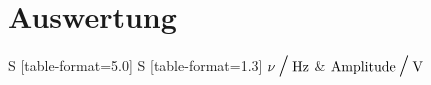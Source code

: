 \newpage 
\section{Auswertung}

\begin{table}[ht]
  \centering
  \small
  \caption{Messdaten zur Wien-Robinson-Brücke}
  \label{tab:tab2}
  \begin{tabular}{S [table-format=5.0] S [table-format=1.3]}
   \toprule
   {$\nu \mathbin{\scalebox{1.5} / } \si{\hertz}$} & $\text{Amplitude} \mathbin{\scalebox{1.5} / } \si{\volt}$\\
   \midrule
  \end{tabular}
\end{table} 


